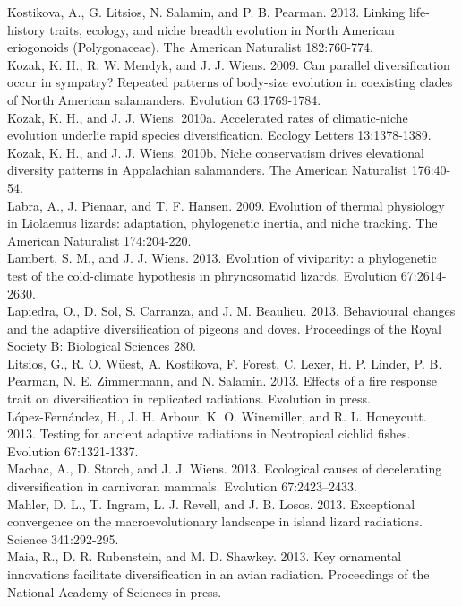 Kostikova, A., G. Litsios, N. Salamin, and P. B. Pearman. 2013. Linking life-history traits, ecology, and niche breadth evolution in North American eriogonoids (Polygonaceae). The American Naturalist 182:760-774.\\
Kozak, K. H., R. W. Mendyk, and J. J. Wiens. 2009. Can parallel diversification occur in sympatry? Repeated patterns of body-size evolution in coexisting clades of North American salamanders. Evolution 63:1769-1784.\\
Kozak, K. H., and J. J. Wiens. 2010a. Accelerated rates of climatic-niche evolution underlie rapid species diversification. Ecology Letters 13:1378-1389.\\
Kozak, K. H., and J. J. Wiens. 2010b. Niche conservatism drives elevational diversity patterns in Appalachian salamanders. The American Naturalist 176:40-54.\\
Labra, A., J. Pienaar, and T. F. Hansen. 2009. Evolution of thermal physiology in Liolaemus lizards: adaptation, phylogenetic inertia, and niche tracking. The American Naturalist 174:204-220.\\
Lambert, S. M., and J. J. Wiens. 2013. Evolution of viviparity: a phylogenetic test of the cold-climate hypothesis in phrynosomatid lizards. Evolution 67:2614-2630.\\
Lapiedra, O., D. Sol, S. Carranza, and J. M. Beaulieu. 2013. Behavioural changes and the adaptive diversification of pigeons and doves. Proceedings of the Royal Society B: Biological Sciences 280.\\
Litsios, G., R. O. Wüest, A. Kostikova, F. Forest, C. Lexer, H. P. Linder, P. B. Pearman, N. E. Zimmermann, and N. Salamin. 2013. Effects of a fire response trait on diversification in replicated radiations. Evolution in press.\\
L\'{o}pez-Fern\'{a}ndez, H., J. H. Arbour, K. O. Winemiller, and R. L. Honeycutt. 2013. Testing for ancient adaptive radiations in Neotropical cichlid fishes. Evolution 67:1321-1337.\\
Machac, A., D. Storch, and J. J. Wiens. 2013. Ecological causes of decelerating diversification in carnivoran mammals. Evolution 67:2423–2433.\\
Mahler, D. L., T. Ingram, L. J. Revell, and J. B. Losos. 2013. Exceptional convergence on the macroevolutionary landscape in island lizard radiations. Science 341:292-295.\\
Maia, R., D. R. Rubenstein, and M. D. Shawkey. 2013. Key ornamental innovations facilitate diversification in an avian radiation. Proceedings of the National Academy of Sciences in press.\\
